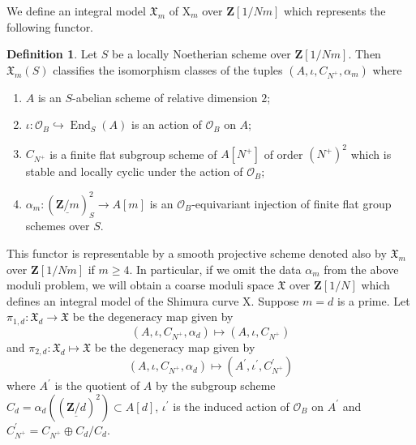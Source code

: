 \documentclass[10pt]{amsart}
\newcommand*\Z{\mathds{Z}}
\newcommand*\ZZ{|[draw,circle]| \Z_2}
\numberwithin{equation}{section}
\theoremstyle{plain}
\numberwithin{equation}{section}
\theoremstyle{definition}
\newtheorem{definition}[theorem]{Definition}
\theoremstyle{remark}
\def\interX{\mathfrak{X}}
\DeclareMathOperator{\End}{End}
\def\calO{\mathcal{O}}
\def\ZZ{\mathbf{Z}}
\def\rmX{\mathrm{X}}
\begin{document}
We define an integral model $\interX_{m}$ of $\rmX_{m}$ over $\ZZ[1/Nm]$ which represents the following functor. 
\begin{definition}\label{Xm}
Let $S$ be a locally Noetherian  scheme over $\ZZ[1/Nm]$. Then $\interX_{m}(S)$ classifies the isomorphism classes of the tuples $(A, \iota, C_{N^{+}}, \alpha_{m})$ where
\begin{enumerate}
\item $A$ is an $S$-abelian scheme of relative dimension $2$;
\item $\iota: \calO_{B}\hookrightarrow \End_{S}(A)$ is an action of $\calO_{B}$ on $A$;
\item $C_{N^{+}}$ is a finite flat subgroup scheme of $A[N^{+}]$ of order $(N^{+})^{2}$ which is stable and locally cyclic under the action of $\calO_{B}$;
\item $\alpha_{m}: (\underline{\ZZ/m})^{2}_{S}\rightarrow A[m]$ is an $\calO_{B}$-equivariant injection of finite flat group schemes over $S$.
\end{enumerate} 
\end{definition}
This functor is representable by a smooth projective scheme denoted also by $\interX_{m}$ over $\ZZ[1/Nm]$ if $m\geq 4$. In particular, if we omit the data $\alpha_{m}$ from the above moduli problem, we will obtain a coarse moduli space $\interX$ over  $\ZZ[1/N]$ which defines an integral model of the Shimura curve $\rmX$. Suppose $m=d$ is a prime.
Let $\pi_{1,d}: \interX_{d}\rightarrow\interX$ be the degeneracy map given by
\begin{equation}\label{deg-d-1}
(A, \iota, C_{N^{+}}, \alpha_{d}) \mapsto (A, \iota, C_{N^{+}})
\end{equation}
and $\pi_{2,d}: \interX_{d}\mapsto\interX$ be the degeneracy map given by 
\begin{equation}\label{deg-d-2}
(A, \iota, C_{N^{+}}, \alpha_{d})\mapsto (A^{\prime}, \iota^{\prime}, C^{\prime}_{N^{+}}) 
\end{equation}
where $A^{\prime}$ is the quotient of $A$ by the subgroup scheme $C_{d}=\alpha_{d}((\underline{\ZZ/d})^{2})\subset A[d]$, $\iota^{\prime}$ is the induced action of $\calO_{B}$ on $A^{\prime}$ and $C^{\prime}_{N^{+}}=C_{N^{+}}\oplus C_{d}/C_{d}$.
\end{document}
